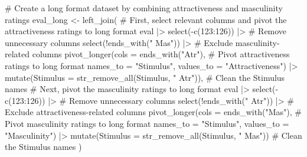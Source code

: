 \documentclass[
  bookmarksnumbered]{article}
\newenvironment{Shaded}{\begin{snugshade}}{\end{snugshade}}
\newcommand{\AttributeTok}[1]{\textcolor[rgb]{0.80,0.80,0.80}{#1}}
\newcommand{\CommentTok}[1]{\textcolor[rgb]{0.50,0.62,0.50}{#1}}
\newcommand{\DecValTok}[1]{\textcolor[rgb]{0.86,0.86,0.80}{#1}}
\newcommand{\FunctionTok}[1]{\textcolor[rgb]{0.94,0.94,0.56}{#1}}
\newcommand{\NormalTok}[1]{\textcolor[rgb]{0.80,0.80,0.80}{#1}}
\newcommand{\OtherTok}[1]{\textcolor[rgb]{0.94,0.94,0.56}{#1}}
\newcommand{\SpecialCharTok}[1]{\textcolor[rgb]{0.86,0.64,0.64}{#1}}
\newcommand{\StringTok}[1]{\textcolor[rgb]{0.80,0.58,0.58}{#1}}
\begin{document}
\begin{Shaded}
\begin{Highlighting}[]
\CommentTok{\# Create a long format dataset by combining attractiveness and masculinity ratings}
\NormalTok{eval\_long }\OtherTok{\textless{}{-}} \FunctionTok{left\_join}\NormalTok{(}
  \CommentTok{\# First, select relevant columns and pivot the attractiveness ratings to long format}
\NormalTok{  eval }\SpecialCharTok{|\textgreater{}}
    \FunctionTok{select}\NormalTok{(}\SpecialCharTok{{-}}\FunctionTok{c}\NormalTok{(}\DecValTok{123}\SpecialCharTok{:}\DecValTok{126}\NormalTok{)) }\SpecialCharTok{|\textgreater{}}  \CommentTok{\# Remove unnecessary columns}
    \FunctionTok{select}\NormalTok{(}\SpecialCharTok{!}\FunctionTok{ends\_with}\NormalTok{(}\StringTok{" Mas"}\NormalTok{)) }\SpecialCharTok{|\textgreater{}}  \CommentTok{\# Exclude masculinity{-}related columns}
    \FunctionTok{pivot\_longer}\NormalTok{(}\AttributeTok{cols =} \FunctionTok{ends\_with}\NormalTok{(}\StringTok{"Atr"}\NormalTok{),  }\CommentTok{\# Pivot attractiveness ratings to long format}
                 \AttributeTok{names\_to =} \StringTok{"Stimulus"}\NormalTok{, }
                 \AttributeTok{values\_to =} \StringTok{"Attractiveness"}\NormalTok{) }\SpecialCharTok{|\textgreater{}} 
    \FunctionTok{mutate}\NormalTok{(}\AttributeTok{Stimulus =} \FunctionTok{str\_remove\_all}\NormalTok{(Stimulus, }\StringTok{" Atr"}\NormalTok{)),  }\CommentTok{\# Clean the Stimulus names}
  \CommentTok{\# Next, pivot the masculinity ratings to long format}
\NormalTok{  eval }\SpecialCharTok{|\textgreater{}} 
    \FunctionTok{select}\NormalTok{(}\SpecialCharTok{{-}}\FunctionTok{c}\NormalTok{(}\DecValTok{123}\SpecialCharTok{:}\DecValTok{126}\NormalTok{)) }\SpecialCharTok{|\textgreater{}}  \CommentTok{\# Remove unnecessary columns}
    \FunctionTok{select}\NormalTok{(}\SpecialCharTok{!}\FunctionTok{ends\_with}\NormalTok{(}\StringTok{" Atr"}\NormalTok{)) }\SpecialCharTok{|\textgreater{}}  \CommentTok{\# Exclude attractiveness{-}related columns}
    \FunctionTok{pivot\_longer}\NormalTok{(}\AttributeTok{cols =} \FunctionTok{ends\_with}\NormalTok{(}\StringTok{"Mas"}\NormalTok{),  }\CommentTok{\# Pivot masculinity ratings to long format}
                 \AttributeTok{names\_to =} \StringTok{"Stimulus"}\NormalTok{, }
                 \AttributeTok{values\_to =} \StringTok{"Masculinity"}\NormalTok{) }\SpecialCharTok{|\textgreater{}} 
    \FunctionTok{mutate}\NormalTok{(}\AttributeTok{Stimulus =} \FunctionTok{str\_remove\_all}\NormalTok{(Stimulus, }\StringTok{" Mas"}\NormalTok{))  }\CommentTok{\# Clean the Stimulus names}
\NormalTok{)}
\end{Highlighting}
\end{Shaded}
\end{document}
